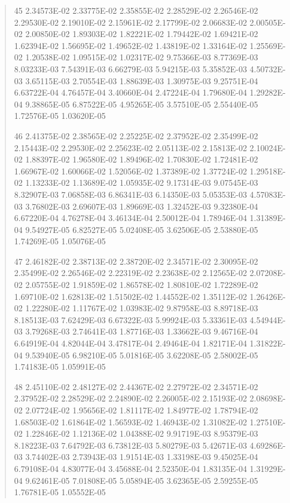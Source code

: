 \documentclass[letterpaper,10pt,english]{sphinxmanual}
\begin{document}
\begin{quote}
\begin{DUlineblock}{0em}
\item[] 45   2.34573E-02  2.33775E-02  2.35855E-02  2.28529E-02  2.26546E-02  2.29530E-02  2.19010E-02  2.15961E-02  2.17799E-02  2.06683E-02  2.00505E-02  2.00850E-02  1.89303E-02  1.82221E-02  1.79442E-02  1.69421E-02  1.62394E-02  1.56695E-02  1.49652E-02  1.43819E-02  1.33164E-02  1.25569E-02  1.20538E-02  1.09515E-02  1.02317E-02  9.75366E-03  8.77369E-03  8.03233E-03  7.54391E-03  6.66279E-03  5.94215E-03  5.35852E-03  4.50732E-03  3.65115E-03  2.70554E-03  1.88639E-03  1.30975E-03  9.25751E-04  6.63722E-04  4.76457E-04  3.40660E-04  2.47224E-04  1.79680E-04  1.29282E-04  9.38865E-05  6.87522E-05  4.95265E-05  3.57510E-05  2.55440E-05  1.72576E-05  1.03620E-05
\item[] 46   2.41375E-02  2.38565E-02  2.25225E-02  2.37952E-02  2.35499E-02  2.15443E-02  2.29530E-02  2.25623E-02  2.05113E-02  2.15813E-02  2.10024E-02  1.88397E-02  1.96580E-02  1.89496E-02  1.70830E-02  1.72481E-02  1.66967E-02  1.60066E-02  1.52056E-02  1.37389E-02  1.37724E-02  1.29518E-02  1.13233E-02  1.13689E-02  1.05935E-02  9.17314E-03  9.07545E-03  8.32907E-03  7.06858E-03  6.86341E-03  6.14350E-03  5.05353E-03  4.57083E-03  3.76802E-03  2.69607E-03  1.89669E-03  1.32452E-03  9.32380E-04  6.67220E-04  4.76278E-04  3.46134E-04  2.50012E-04  1.78946E-04  1.31389E-04  9.54927E-05  6.82527E-05  5.02408E-05  3.62506E-05  2.53880E-05  1.74269E-05  1.05076E-05
\item[] 47   2.46182E-02  2.38713E-02  2.38720E-02  2.34571E-02  2.30095E-02  2.35499E-02  2.26546E-02  2.22319E-02  2.23638E-02  2.12565E-02  2.07208E-02  2.05755E-02  1.91859E-02  1.86578E-02  1.80810E-02  1.72289E-02  1.69710E-02  1.62813E-02  1.51502E-02  1.44552E-02  1.35112E-02  1.26426E-02  1.22280E-02  1.11767E-02  1.03983E-02  9.87958E-03  8.89718E-03  8.18513E-03  7.62429E-03  6.67322E-03  5.99924E-03  5.33361E-03  4.54944E-03  3.79268E-03  2.74641E-03  1.87716E-03  1.33662E-03  9.46716E-04  6.64919E-04  4.82044E-04  3.47817E-04  2.49464E-04  1.82171E-04  1.31822E-04  9.53940E-05  6.98210E-05  5.01816E-05  3.62208E-05  2.58002E-05  1.74183E-05  1.05991E-05
\item[] 48   2.45110E-02  2.48127E-02  2.44367E-02  2.27972E-02  2.34571E-02  2.37952E-02  2.28529E-02  2.24890E-02  2.26005E-02  2.15193E-02  2.08698E-02  2.07724E-02  1.95656E-02  1.81117E-02  1.84977E-02  1.78794E-02  1.68503E-02  1.61864E-02  1.56593E-02  1.46943E-02  1.31082E-02  1.27510E-02  1.22846E-02  1.12136E-02  1.04388E-02  9.91719E-03  8.95379E-03  8.18223E-03  7.64792E-03  6.73812E-03  5.80279E-03  5.42671E-03  4.69286E-03  3.74402E-03  2.73943E-03  1.91514E-03  1.33198E-03  9.45025E-04  6.79108E-04  4.83077E-04  3.45688E-04  2.52350E-04  1.83135E-04  1.31929E-04  9.62461E-05  7.01808E-05  5.05894E-05  3.62365E-05  2.59255E-05  1.76781E-05  1.05552E-05

\end{DUlineblock}
\end{quote}
\end{document}
